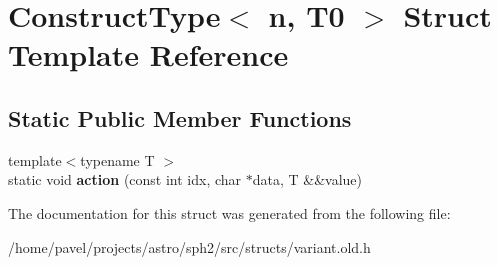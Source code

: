 \hypertarget{structConstructType_3_01n_00_01T0_01_4}{}\section{Construct\+Type$<$ n, T0 $>$ Struct Template Reference}
\label{structConstructType_3_01n_00_01T0_01_4}
\subsection*{Static Public Member Functions}
\begin{DoxyCompactItemize}
\item 
\hypertarget{structConstructType_3_01n_00_01T0_01_4_a7c2521d2c0fec2b8d35fe075e0fce526}{}\label{structConstructType_3_01n_00_01T0_01_4_a7c2521d2c0fec2b8d35fe075e0fce526} 
{\footnotesize template$<$typename T $>$ }\\static void {\bfseries action} (const int idx, char $\ast$data, T \&\&value)
\end{DoxyCompactItemize}


The documentation for this struct was generated from the following file\+:\begin{DoxyCompactItemize}
\item 
/home/pavel/projects/astro/sph2/src/structs/variant.\+old.\+h\end{DoxyCompactItemize}
